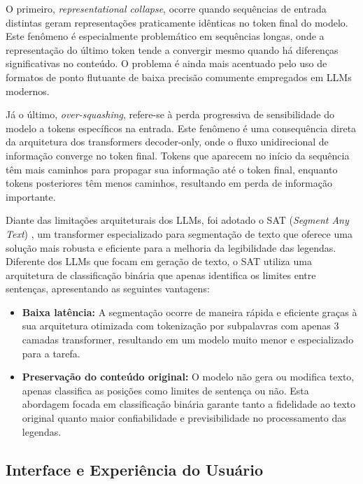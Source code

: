 \documentclass[tcc,capa]{texufpel}
\begin{document}
O primeiro, \textit{representational collapse}, ocorre quando sequências de entrada distintas geram representações praticamente idênticas no token final do modelo. Este fenômeno é especialmente problemático em sequências longas, onde a representação do último token tende a convergir mesmo quando há diferenças significativas no conteúdo. O problema é ainda mais acentuado pelo uso de formatos de ponto flutuante de baixa precisão comumente empregados em LLMs modernos.

Já o último, \textit{over-squashing}, refere-se à perda progressiva de sensibilidade do modelo a tokens específicos na entrada. Este fenômeno é uma consequência direta da arquitetura dos transformers decoder-only, onde o fluxo unidirecional de informação converge no token final. Tokens que aparecem no início da sequência têm mais caminhos para propagar sua informação até o token final, enquanto tokens posteriores têm menos caminhos, resultando em perda de informação importante.

Diante das limitações arquiteturais dos LLMs, foi adotado o SAT (\textit{Segment Any Text}) \cite{frohmann2024segment}, um transformer especializado para segmentação de texto que oferece uma solução mais robusta e eficiente para a melhoria da legibilidade das legendas. Diferente dos LLMs que focam em geração de texto, o SAT utiliza uma arquitetura de classificação binária que apenas identifica os limites entre sentenças, apresentando as seguintes vantagens:

\begin{itemize}
    \item \textbf{Baixa latência:} A segmentação ocorre de maneira rápida e eficiente graças à sua arquitetura otimizada com tokenização por subpalavras com apenas 3 camadas transformer, resultando em um modelo muito menor e especializado para a tarefa.
    
    \item \textbf{Preservação do conteúdo original:} O modelo não gera ou modifica texto, apenas classifica as posições como limites de sentença ou não. Esta abordagem focada em classificação binária garante tanto a fidelidade ao texto original quanto maior confiabilidade e previsibilidade no processamento das legendas.
  \end{itemize}

\subsection{Interface e Experiência do Usuário}
\end{document}
